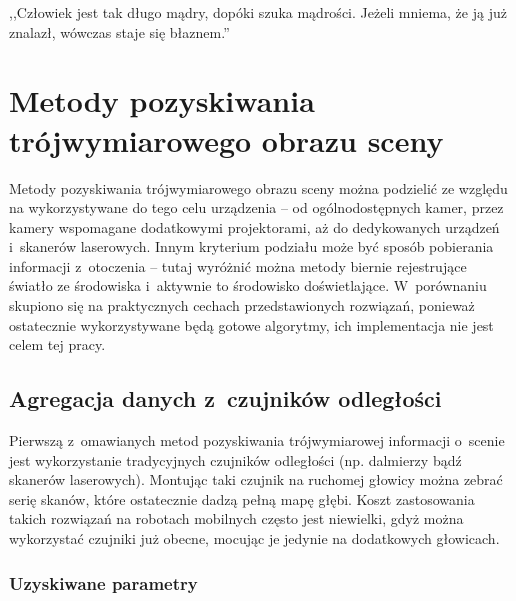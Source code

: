 

\begin{savequote}[70mm]
,,Człowiek jest tak długo mądry, dopóki szuka mądrości. Jeżeli mniema, że ją już
znalazł, wówczas staje się błaznem.''
\end{savequote}

\chapter{Metody pozyskiwania trójwymiarowego obrazu sceny}
\label{chap:porownanie}


Metody pozyskiwania trójwymiarowego obrazu sceny można podzielić ze względu
na wykorzystywane do tego celu urządzenia -- od ogólnodostępnych kamer, przez
kamery wspomagane dodatkowymi projektorami, aż do dedykowanych urządzeń
i~skanerów laserowych. Innym kryterium podziału może być sposób pobierania
informacji z~otoczenia -- tutaj wyróżnić można metody biernie rejestrujące
światło ze środowiska i~aktywnie to środowisko doświetlające. W~porównaniu
skupiono się na praktycznych cechach przedstawionych rozwiązań, ponieważ
ostatecznie wykorzystywane będą gotowe algorytmy, ich implementacja nie jest
celem tej pracy.

\section{Agregacja danych z~czujników odległości}

Pierwszą z~omawianych metod pozyskiwania trójwymiarowej informacji o~scenie jest
wykorzystanie tradycyjnych czujników odległości (np. dalmierzy bądź skanerów
laserowych). Montując taki czujnik na ruchomej głowicy można zebrać serię
skanów, które ostatecznie dadzą pełną mapę głębi. Koszt zastosowania takich
rozwiązań na robotach mobilnych często jest niewielki, gdyż można wykorzystać
czujniki już obecne, mocując je jedynie na dodatkowych głowicach.

\subsection{Uzyskiwane parametry}

